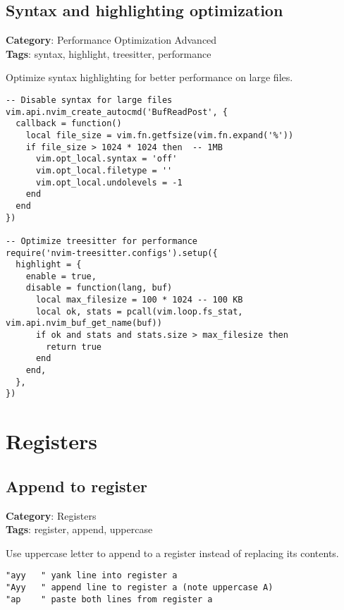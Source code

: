 {{{{{{{{{{\section{Syntax and highlighting optimization}

\textbf{Category}: Performance Optimization Advanced\\ \textbf{Tags}: syntax, highlight, treesitter, performance
\vspace{0.5cm}

Optimize syntax highlighting for better performance on large files.

\begin{Exa*}{}
\begin{Verbatim}[fontsize=\footnotesize, breaklines, breakanywhere]
-- Disable syntax for large files
vim.api.nvim_create_autocmd('BufReadPost', {
  callback = function()
    local file_size = vim.fn.getfsize(vim.fn.expand('%'))
    if file_size > 1024 * 1024 then  -- 1MB
      vim.opt_local.syntax = 'off'
      vim.opt_local.filetype = ''
      vim.opt_local.undolevels = -1
    end
  end
})

-- Optimize treesitter for performance
require('nvim-treesitter.configs').setup({
  highlight = {
    enable = true,
    disable = function(lang, buf)
      local max_filesize = 100 * 1024 -- 100 KB
      local ok, stats = pcall(vim.loop.fs_stat, vim.api.nvim_buf_get_name(buf))
      if ok and stats and stats.size > max_filesize then
        return true
      end
    end,
  },
})
\end{Verbatim}
\end{Exa*}

\chapter{Registers}
\section{Append to register}

\textbf{Category}: Registers\\ \textbf{Tags}: register, append, uppercase
\vspace{0.5cm}

Use uppercase letter to append to a register instead of replacing its contents.

\begin{Exa*}{}
\begin{Verbatim}[fontsize=\footnotesize, breaklines, breakanywhere]
"ayy   " yank line into register a
"Ayy   " append line to register a (note uppercase A)
"ap    " paste both lines from register a
\end{Verbatim}
\end{Exa*}

}}}}}}}}}}
